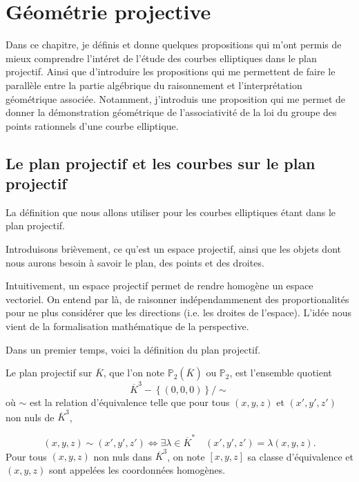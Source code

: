 \chapter{Géométrie projective}
\begin{center}
    Dans ce chapitre, je définis et donne quelques propositions qui m'ont permis de
    mieux comprendre l'intéret de l'étude des courbes elliptiques dans le plan
    projectif. Ainsi que d'introduire les propositions qui me permettent de faire le parallèle
    entre la partie algébrique du raisonnement et l'interprétation géométrique
    associée. Notamment, j'introduis une proposition qui me permet de donner la
    démonstration géométrique de l'associativité de la loi du groupe des points rationnels
    d'une courbe elliptique.

\end{center}

\section{Le plan projectif et les courbes sur le plan projectif}

La définition que nous allons utiliser pour les courbes elliptiques étant dans le plan
projectif.

Introduisons brièvement, ce qu'est un espace projectif, ainsi que les objets dont nous aurons
besoin à savoir le plan, des points et des droites.

Intuitivement, un espace projectif permet de rendre homogène un espace vectoriel. On entend
par là, de raisonner indépendammenent des proportionalités pour ne plus considérer que les
directions (i.e. les droites de l'espace). L'idée nous vient de la formalisation mathématique de la perspective. 

Dans un premier temps, voici la définition du plan projectif.

\begin{definition}
    \label{def:planP2}
    
    Le plan projectif sur $\overline{K}$, que l'on note $\mathbb{P}_{2}(\overline{K})$ ou
    $\mathbb{P}_{2}$, est l'ensemble quotient
    \[
    \overline{K}^3 - \left\{ (0,0,0) \right\} / \sim
    \] 
    où $\sim$ est la relation d'équivalence telle que pour tous $\left( x,y,z \right) $ et
    $\left( x',y',z'\right) $ non nuls de $\overline{K}^3$,

    \[
    \left( x,y,z \right) \sim \left( x',y',z' \right) \iff \exists \lambda \in
    \overline{K}^{*} \quad \left( x',y',z' \right) = \lambda \left( x,y,z \right) 
    .\] 
    Pour tous $\left( x,y,z \right) $ non nuls dans $\overline{K}^3$, on note $\left[
    x,y,z \right] $ sa classe d'équivalence et $(x,y,z)$ sont appelées les coordonnées homogènes.
\end{definition}

